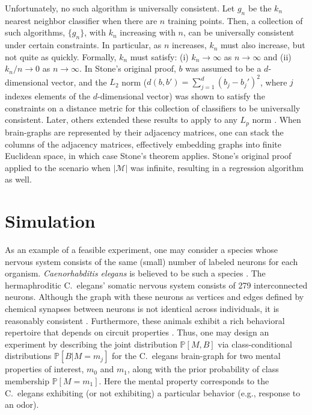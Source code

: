\documentclass{article}
\newcommand{\conv}{\rightarrow}
\newcommand{\PP}{\mathbb{P}}           %
\providecommand{\mc}[1]{\mathcal{#1}}
\begin{document}
Unfortunately, no such algorithm is universally consistent.  Let $g_n$ be the $k_n$ nearest neighbor classifier when there are $n$ training points.  Then, a collection of such algorithms, $\{g_n\}$,  with $k_n$ increasing with $n$, can be universally consistent under certain constraints. In particular, as $n$ increases, $k_n$ must also increase, but not quite as quickly.  Formally, $k_n$ must satisfy: (i) $k_n \conv \infty$ as $n \conv \infty$ and (ii) $k_n/n \conv 0$ as $n\conv\infty$. In Stone's original proof, $b$ was assumed to be a $d$-dimensional vector, and the $L_2$ norm ($d(b,b')=\sum_{j=1}^d (b_j-b_j')^2$, where $j$ indexes elements of the $d$-dimensional vector) was shown to satisfy the constraints on a distance metric for this collection of classifiers to be universally consistent.  Later, others extended these results to apply to any $L_p$ norm \cite{DGL96}.  When brain-graphs are represented by their adjacency matrices, one can stack the columns of the adjacency matrices, effectively embedding graphs into finite Euclidean space, in which case Stone's theorem applies.  Stone's original proof applied to the scenario when $|\mc{M}|$ was infinite, resulting in a regression algorithm as well.


\section{Simulation} %
\label{sec:sim}

As an example of a feasible experiment, one may consider a species whose nervous system consists of the same (small) number of labeled neurons for each organism. {\it Caenorhabditis elegans} is believed to be such a species \cite{Durbin87}. The hermaphroditic C.~elegans' somatic nervous system consists of 279 interconnected neurons. Although the graph with these neurons as vertices and edges defined by chemical synapses between neurons is not identical across individuals, it is reasonably consistent \cite{Durbin87}. Furthermore, these animals exhibit a rich behavioral repertoire that depends on circuit properties \cite{deBonoMaricq05}. Thus, one may design an experiment by describing the joint distribution $\PP[M,B]$ via class-conditional distributions $\PP[B|M=m_j]$ for the C.~elegans brain-graph for two mental properties of interest, $m_0$ and $m_1$, along with the prior probability of class membership $\PP[M=m_1]$. Here the mental property corresponds to the C.~elegans exhibiting (or not exhibiting) a particular behavior (e.g., response to an odor).
\end{document}
